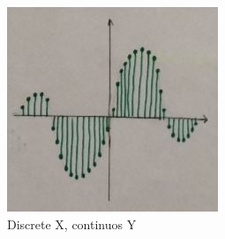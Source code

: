 \begin{description}
		\begin{figure}[!h]
			\centering
			\includegraphics[width=0.7\linewidth]{images/DiscreteX_continuosY}
			\caption{Discrete X, continuos Y}
			\label{fig:DiscreteX_continuosY}
		\end{figure}
		

\end{description}

